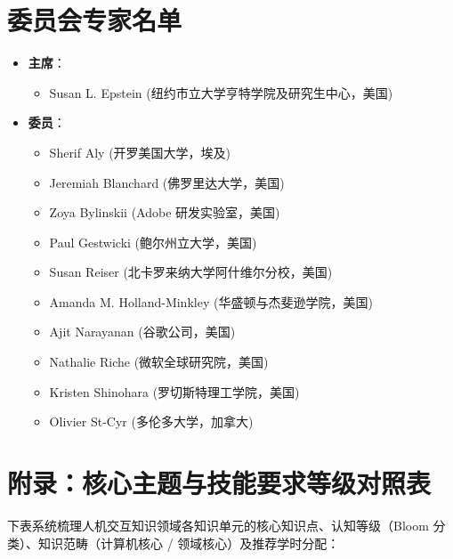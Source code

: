 \section{委员会专家名单}

\begin{itemize}
    \item \textbf{主席}：
    \begin{itemize}
        \item Susan L. Epstein (纽约市立大学亨特学院及研究生中心，美国)
    \end{itemize}
    \item \textbf{委员}：
    \begin{itemize}
        \item Sherif Aly (开罗美国大学，埃及)
        \item Jeremiah Blanchard (佛罗里达大学，美国)
        \item Zoya Bylinskii (Adobe 研发实验室，美国)
        \item Paul Gestwicki (鲍尔州立大学，美国)
        \item Susan Reiser (北卡罗来纳大学阿什维尔分校，美国)
        \item Amanda M. Holland-Minkley (华盛顿与杰斐逊学院，美国)
        \item Ajit Narayanan (谷歌公司，美国)
        \item Nathalie Riche (微软全球研究院，美国)
        \item Kristen Shinohara (罗切斯特理工学院，美国)
        \item Olivier St-Cyr (多伦多大学，加拿大)
    \end{itemize}
\end{itemize}

\clearpage
\onecolumn
\section{附录：核心主题与技能要求等级对照表}

下表系统梳理人机交互知识领域各知识单元的核心知识点、认知等级（Bloom 分类）、知识范畴（计算机核心 / 领域核心）及推荐学时分配：

